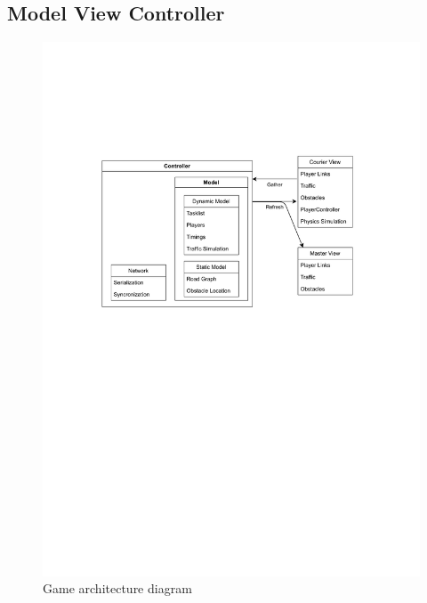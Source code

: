 \documentclass{article}
\begin{document}
\subsection{Model View Controller}
\begin{figure}[H]
\includegraphics[width=\textwidth]{game architecture}
\caption{Game architecture diagram}
\label{fig:gamearch}
\end{figure}
\end{document}
